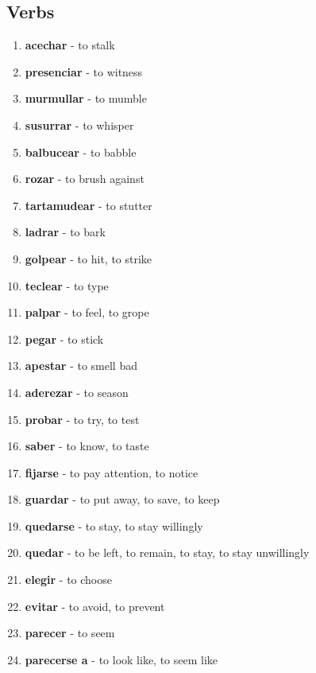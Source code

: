 \documentclass[12pt]{article}
\begin{document}
        \subsection{Verbs}
            \begin{enumerate}
                \item \textbf{acechar} - to stalk
                \item \textbf{presenciar} - to witness
                \item \textbf{murmullar} - to mumble
                \item \textbf{susurrar} - to whisper
                \item \textbf{balbucear} - to babble
                \item \textbf{rozar} - to brush against
                \item \textbf{tartamudear} - to stutter
                \item \textbf{ladrar} - to bark
                \item \textbf{golpear} - to hit, to strike
                \item \textbf{teclear} - to type
                \item \textbf{palpar} - to feel, to grope
                \item \textbf{pegar} - to stick
                \item \textbf{apestar} - to smell bad
                \item \textbf{aderezar} - to season
                \item \textbf{probar} - to try, to test
                \item \textbf{saber} - to know, to taste
                \item \textbf{fijarse} - to pay attention, to notice
                \item \textbf{guardar} - to put away, to save, to keep
                \item \textbf{quedarse} - to stay, to stay willingly
                \item \textbf{quedar} - to be left, to remain, to stay, to stay unwillingly
                \item \textbf{elegir} - to choose
                \item \textbf{evitar} - to avoid, to prevent
                \item \textbf{parecer} - to seem
                \item \textbf{parecerse a} - to look like, to seem like

\end{enumerate}
\end{document}
